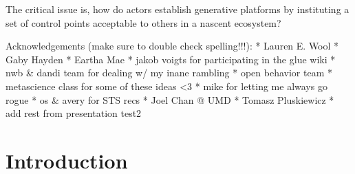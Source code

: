 \documentclass[10pt]{article}
\begin{document}
\begin{leftbar}
The critical issue is, how do actors establish generative platforms by
instituting a set of control points acceptable to others in a nascent
ecosystem? \cite{tilsonDigitalInfrastructuresMissing2010} 
\end{leftbar}

Acknowledgements (make sure to double check spelling!!!): * Lauren E.
Wool * Gaby Hayden * Eartha Mae * jakob voigts for participating in the
glue wiki * nwb \& dandi team for dealing w/ my inane rambling * open
behavior team * metascience class for some of these ideas \textless3 *
mike for letting me always go rogue * os \& avery for STS recs * Joel
Chan @ UMD * Tomasz Pluskiewicz * add rest from presentation test2

\hypertarget{introduction}{%
\section{Introduction}\label{introduction}}
\end{document}
